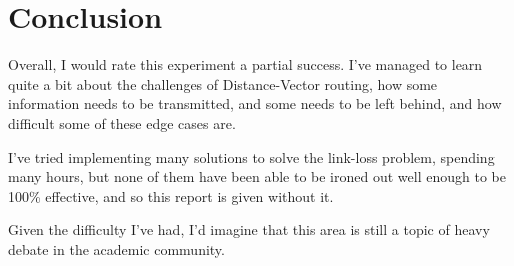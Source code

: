 \documentclass[fleqn,11pt]{article}
\begin{document}
\section{Conclusion}
Overall, I would rate this experiment a partial success.
I've managed to learn quite a bit about the challenges of Distance-Vector routing, how some information needs to be transmitted, and some needs to be left behind, and how difficult some of these edge cases are.

I've tried implementing many solutions to solve the link-loss problem, spending many hours, but none of them have been able to be ironed out well enough to be 100\% effective, and so this report is given without it.

Given the difficulty I've had, I'd imagine that this area is still a topic of heavy debate in the academic community.
\end{document}
